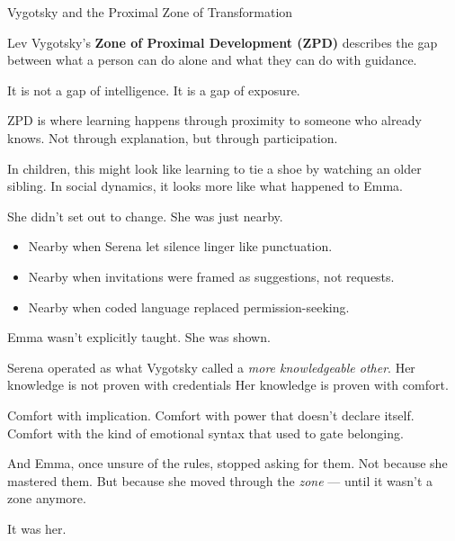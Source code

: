 \begin{PsychologicalSidebar}{Vygotsky and the Proximal Zone of Transformation}

    Lev Vygotsky’s \textbf{Zone of Proximal Development (ZPD)} describes the gap between what 
    a person can do alone and what they can do with guidance.
    
    \medskip
    
    It is not a gap of intelligence.
    It is a gap of exposure.
    
    \medskip
    
    ZPD is where learning happens through proximity to someone 
    who already knows.
    Not through explanation, but through participation.
    
    \medskip
    
    In children, this might look like learning to tie a shoe by watching an older sibling.
    In social dynamics, it looks more like what happened to Emma.
    
    \medskip
    
    She didn’t set out to change.
    She was just nearby.

    \medskip
    
    
    \begin{itemize}
    \item Nearby when Serena let silence linger like punctuation.
    \item Nearby when invitations were framed as suggestions, not requests.
    \item Nearby when coded language replaced permission-seeking.
    \end{itemize}
    
    \medskip
    
    Emma wasn’t explicitly taught.
    She was shown.

    \medskip
    
    
    Serena operated as what Vygotsky called a \textit{more knowledgeable other}. 
    Her knowledge is not proven with credentials
    Her knowledge is proven with comfort.

    \medskip

    Comfort with implication.
    Comfort with power that doesn’t declare itself.
    Comfort with the kind of emotional syntax that used to gate belonging.
    
    \medskip
    
    And Emma, once unsure of the rules, stopped asking for them.
    Not because she mastered them.
    But because she moved through the \textit{zone} —
    until it wasn’t a zone anymore.

    \medskip
    
    
    It was her.
    
\end{PsychologicalSidebar}



